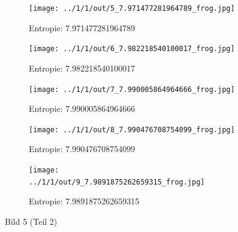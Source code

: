 \begin{figure}
	\centering

	\begin{subfigure}{0.25\textwidth}
		\texttt{[image: ../1/1/out/5\_7.971477281964789\_frog.jpg]}
		\caption{Entropie: 7.971477281964789}
	\end{subfigure}

	\begin{subfigure}{0.25\textwidth}
		\texttt{[image: ../1/1/out/6\_7.982218540100017\_frog.jpg]}
		\caption{Entropie: 7.982218540100017}
	\end{subfigure}

	\begin{subfigure}{0.25\textwidth}
		\texttt{[image: ../1/1/out/7\_7.990005864964666\_frog.jpg]}
		\caption{Entropie: 7.990005864964666}
	\end{subfigure}

	\begin{subfigure}{0.25\textwidth}
		\texttt{[image: ../1/1/out/8\_7.990476708754099\_frog.jpg]}
		\caption{Entropie: 7.990476708754099}
	\end{subfigure}

	\begin{subfigure}{0.25\textwidth}
		\texttt{[image: ../1/1/out/9\_7.9891875262659315\_frog.jpg]}
		\caption{Entropie: 7.9891875262659315}
	\end{subfigure}

	\caption{Bild 5 (Teil 2)}
\end{figure}

